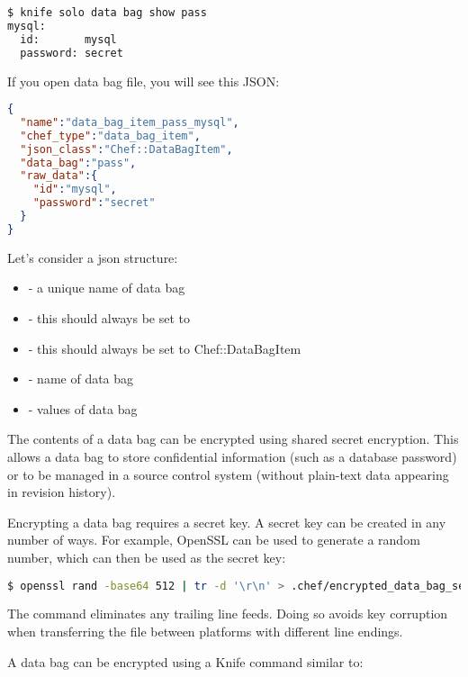 \begin{lstlisting}[language=Bash,label=lst:my-cloud-chef-databag4]
$ knife solo data bag show pass
mysql:
  id:       mysql
  password: secret
\end{lstlisting}

If you open data bag file, you will see this JSON:

\begin{lstlisting}[language=JSON,label=lst:my-cloud-chef-databag10,title=my-cloud/data\_bags/pass/mysql.json]
{
  "name":"data_bag_item_pass_mysql",
  "chef_type":"data_bag_item",
  "json_class":"Chef::DataBagItem",
  "data_bag":"pass",
  "raw_data":{
    "id":"mysql",
    "password":"secret"
  }
}
\end{lstlisting}

Let's consider a json structure:

\begin{itemize}
  \item {} - a unique name of data bag
  \item {} - this should always be set to 
  \item {} - this should always be set to Chef::DataBagItem
  \item {} - name of data bag
  \item {} - values of data bag
\end{itemize}

The contents of a data bag can be encrypted using shared secret encryption. This allows a data bag to store confidential information (such as a database password) or to be managed in a source control system (without plain-text data appearing in revision history).

Encrypting a data bag requires a secret key. A secret key can be created in any number of ways. For example, OpenSSL can be used to generate a random number, which can then be used as the secret key:

\begin{lstlisting}[language=Bash,label=lst:my-cloud-chef-databag5]
$ openssl rand -base64 512 | tr -d '\r\n' > .chef/encrypted_data_bag_secret
\end{lstlisting}

The  command eliminates any trailing line feeds. Doing so avoids key corruption when transferring the file between platforms with different line endings.

A data bag can be encrypted using a Knife command similar to:

